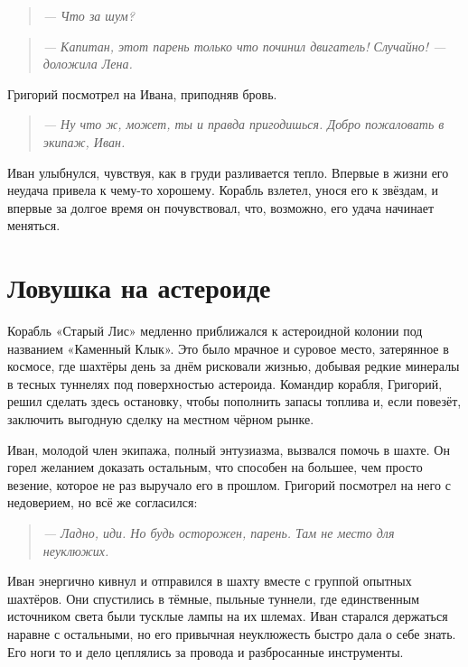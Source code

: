 \documentclass[12pt,a4paper]{book} %
\newenvironment{dialogue}{\begin{quote}\itshape}{\end{quote}}
\begin{document}
\begin{dialogue}
--- Что за шум?
\end{dialogue}

\begin{dialogue}
--- Капитан, этот парень только что починил двигатель! Случайно! --- доложила Лена.
\end{dialogue}

Григорий посмотрел на Ивана, приподняв бровь.

\begin{dialogue}
--- Ну что ж, может, ты и правда пригодишься. Добро пожаловать в экипаж, Иван.
\end{dialogue}

Иван улыбнулся, чувствуя, как в груди разливается тепло. Впервые в жизни его неудача привела к чему-то хорошему. Корабль взлетел, унося его к звёздам, и впервые за долгое время он почувствовал, что, возможно, его удача начинает меняться.

\chapter{Ловушка на астероиде}

Корабль «Старый Лис» медленно приближался к астероидной колонии под названием «Каменный Клык». Это было мрачное и суровое место, затерянное в космосе, где шахтёры день за днём рисковали жизнью, добывая редкие минералы в тесных туннелях под поверхностью астероида. Командир корабля, Григорий, решил сделать здесь остановку, чтобы пополнить запасы топлива и, если повезёт, заключить выгодную сделку на местном чёрном рынке.

Иван, молодой член экипажа, полный энтузиазма, вызвался помочь в шахте. Он горел желанием доказать остальным, что способен на большее, чем просто везение, которое не раз выручало его в прошлом. Григорий посмотрел на него с недоверием, но всё же согласился:

\begin{dialogue}
--- Ладно, иди. Но будь осторожен, парень. Там не место для неуклюжих.
\end{dialogue}

Иван энергично кивнул и отправился в шахту вместе с группой опытных шахтёров. Они спустились в тёмные, пыльные туннели, где единственным источником света были тусклые лампы на их шлемах. Иван старался держаться наравне с остальными, но его привычная неуклюжесть быстро дала о себе знать. Его ноги то и дело цеплялись за провода и разбросанные инструменты.
\end{document}
